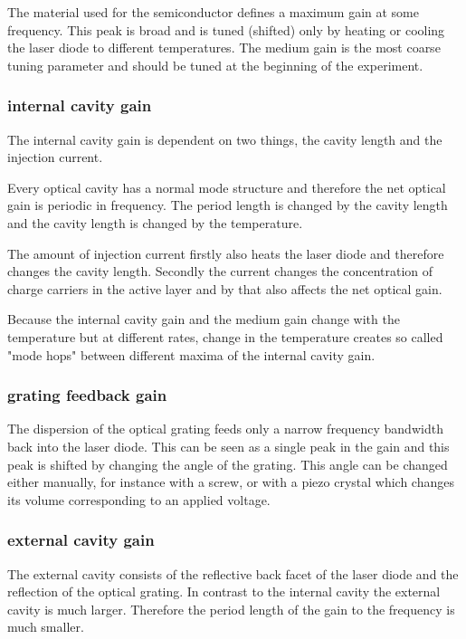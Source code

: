 The material used for the semiconductor defines a maximum gain at some frequency.
This peak is broad and is tuned (shifted) only by heating or cooling the laser diode to different temperatures.
The medium gain is the most coarse tuning parameter and should be tuned at the beginning of the experiment.

\subsubsection{internal cavity gain}
\label{sssec:internal_cavity_gain}

The internal cavity gain is dependent on two things, the cavity length and the injection current.

Every optical cavity has a normal mode structure and therefore the net optical gain is periodic in frequency.
The period length is changed by the cavity length and the cavity length is changed by the temperature.

The amount of injection current firstly also heats the laser diode and therefore changes the cavity length.
Secondly the current changes the concentration of charge carriers in the active layer and by that also affects the net optical gain.

Because the internal cavity gain and the medium gain change with the temperature but at different rates, 
change in the temperature creates so called "mode hops" between different maxima of the internal cavity gain.

\subsubsection{grating feedback gain}
\label{sssec:grating_feedback_gain}

The dispersion of the optical grating feeds only a narrow frequency bandwidth back into the laser diode.
This can be seen as a single peak in the gain and this peak is shifted by changing the angle of the grating.
This angle can be changed either manually, for instance with a screw, or with a piezo crystal which changes its volume corresponding to an applied voltage.

\subsubsection{external cavity gain}
\label{sssec:external_cavity_gain}

The external cavity consists of the reflective back facet of the laser diode and the reflection of the optical grating.
In contrast to the internal cavity the external cavity is much larger.
Therefore the period length of the gain to the frequency is much smaller. 

